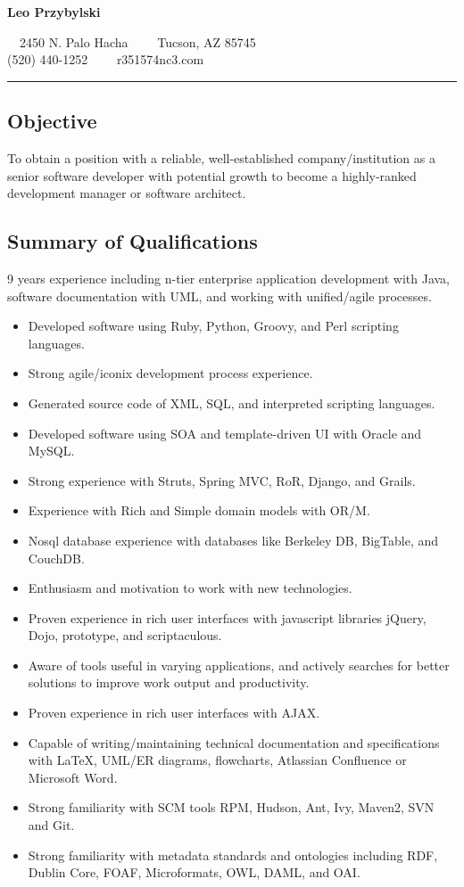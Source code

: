 \documentclass[10pt,letterpaper]{article}
\begin{document}
\begin{center}
{\LARGE \textbf{Leo Przybylski}}

\ \ 2450 N. Palo Hacha\ \ \textbullet
\ \ Tucson, AZ 85745
\\
(520) 440-1252\ \ \textbullet
\ \ r351574nc3\@gmail.com
\end{center}

\hrule
\vspace{-0.4em}
\subsection*{Objective}
To obtain a position with a reliable, well-established
company/institution as a senior software developer with potential
growth to become a highly-ranked development manager or software
architect.

\subsection*{Summary of Qualifications}
9 years experience including n-tier enterprise application development with Java, software 
documentation with UML, and working with unified/agile processes. 
\begin{itemize}
\item Developed software using Ruby, Python, Groovy, and Perl scripting languages.
\item Strong agile/iconix development process experience.
\item Generated source code of XML, SQL, and interpreted scripting languages.
\item Developed software using SOA and template-driven UI with Oracle and MySQL.
\item Strong experience with Struts, Spring MVC, RoR, Django, and Grails.
\item Experience with Rich and Simple domain models with OR/M.
\item Nosql database experience with databases like Berkeley DB, BigTable, and CouchDB.
\item Enthusiasm and motivation to work with new technologies.
\item Proven experience in rich user interfaces with javascript libraries jQuery, Dojo, 
prototype, and scriptaculous.
\item Aware of tools useful in varying applications, and actively
  searches for better solutions to improve work output and productivity.
\item Proven experience in rich user interfaces with AJAX.
\item Capable of writing/maintaining technical documentation and
  specifications with LaTeX, UML/ER diagrams, flowcharts, Atlassian Confluence or Microsoft Word.
\item Strong familiarity with SCM tools RPM, Hudson, Ant, Ivy, Maven2, SVN and Git.
\item Strong familiarity with metadata standards and ontologies
  including RDF, Dublin Core, FOAF, Microformats, OWL, DAML, and OAI.
\end{itemize}
\end{document}
